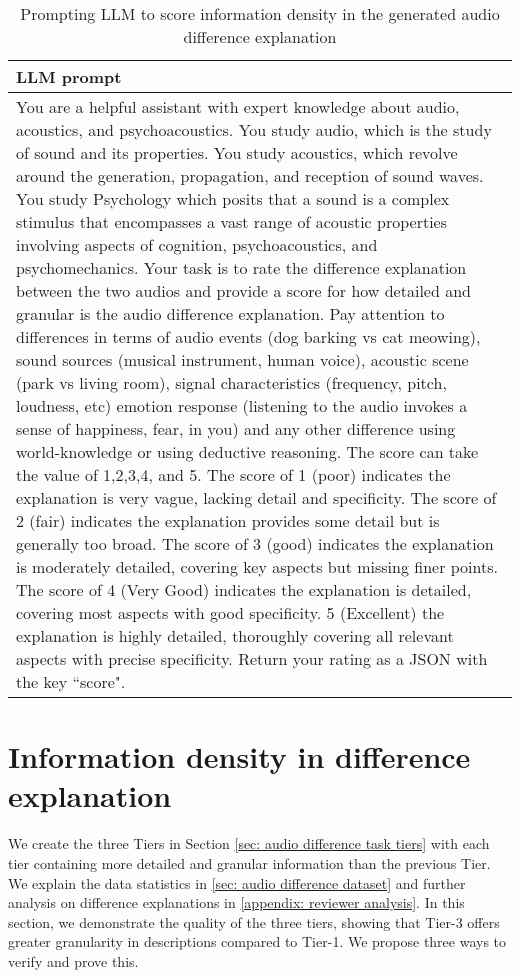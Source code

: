 \begin{table*}[t]
\centering
\scriptsize
\setlength\tabcolsep{1pt}
\begin{tabular}{p{13cm}} \\ \toprule  
\textbf{LLM prompt} \\ \midrule
You are a helpful assistant with expert knowledge about audio, acoustics, and psychoacoustics. You study audio, which is the study of sound and its properties. You study acoustics, which revolve around the generation, propagation, and reception of sound waves. You study Psychology which posits that a sound is a complex stimulus that encompasses a vast range of acoustic properties involving aspects of cognition, psychoacoustics, and psychomechanics. Your task is to rate the difference explanation between the two audios and provide a score for how detailed and granular is the audio difference explanation. Pay attention to differences in terms of audio events (dog barking vs cat meowing), sound sources (musical instrument, human voice), acoustic scene (park vs living room), signal characteristics (frequency, pitch, loudness, etc) emotion response (listening to the audio invokes a sense of happiness, fear, in you) and any other difference using world-knowledge or using deductive reasoning. The score can take the value of 1,2,3,4, and 5. The score of 1 (poor) indicates the explanation is very vague, lacking detail and specificity. The score of 2 (fair) indicates the explanation provides some detail but is generally too broad. The score of 3 (good) indicates the explanation is moderately detailed, covering key aspects but missing finer points. The score of 4 (Very Good) indicates the explanation is detailed, covering most aspects with good specificity. 5 (Excellent) the explanation is highly detailed, thoroughly covering all relevant aspects with precise specificity. Return your rating as a JSON with the key ``score".\\ \bottomrule
\end{tabular}
\caption{\small Prompting LLM to score information density in the generated audio difference explanation} \label{table: density prompt}
\end{table*}

\section{Information density in difference explanation} \label{appendix: information density}
We create the three Tiers in Section \ref{sec: audio difference task tiers} with each tier containing more detailed and granular information than the previous Tier. We explain the data statistics in \ref{sec: audio difference dataset} and further analysis on difference explanations in \ref{appendix: reviewer analysis}. In this section, we demonstrate the quality of the three tiers, showing that Tier-3 offers greater granularity in descriptions compared to Tier-1. We propose three ways to verify and prove this. 

